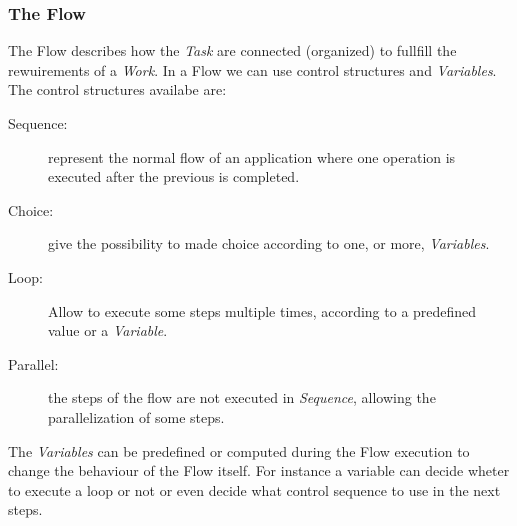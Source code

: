 \subsubsection{The Flow}
The Flow describes how the \emph{Task} are connected (organized) to fullfill the
rewuirements of a \emph{Work}. In a Flow we can use control structures and
\emph{Variables}. The control structures availabe are:
\begin{description}
     \item[Sequence:] represent the normal flow of an application where one
     operation is executed after the previous is completed.
     \item[Choice:] give the possibility to made choice according to one, or
     more, \emph{Variables}.
     \item[Loop:] Allow to execute some steps multiple times, according to a
     predefined value or a \emph{Variable}.
     \item[Parallel:] the steps of the flow are not executed in \emph{Sequence},
     allowing the parallelization of some steps.
 \end{description} 
The \emph{Variables} can be predefined or computed during the Flow execution to
change the behaviour of the Flow itself. For instance a variable can decide
wheter to execute a loop or not or even decide what control sequence to use in
the next steps.






